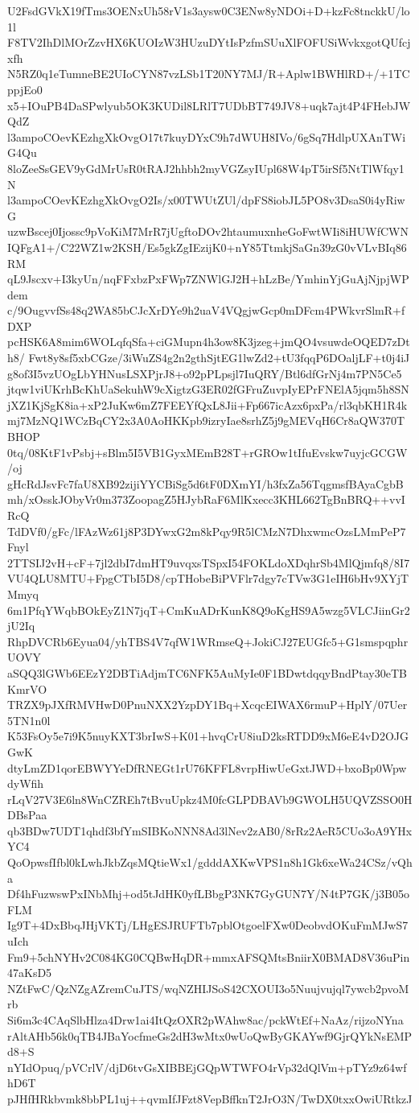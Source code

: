 U2FsdGVkX19fTms3OENxUh58rV1s3aysw0C3ENw8yNDOi+D+kzFc8tnckkU/lo1l
F8TV2IhDlMOrZzvHX6KUOIzW3HUzuDYtIsPzfmSUuXlFOFUSiWvkxgotQUfcjxfh
N5RZ0q1eTumneBE2UIoCYN87vzLSb1T20NY7MJ/R+Aplw1BWHlRD+/+1TCppjEo0
x5+IOuPB4DaSPwlyub5OK3KUDil8LRlT7UDbBT749JV8+uqk7ajt4P4FHebJWQdZ
l3ampoCOevKEzhgXkOvgO17t7kuyDYxC9h7dWUH8IVo/6gSq7HdlpUXAnTWiG4Qu
8loZeeSsGEV9yGdMrUsR0tRAJ2hhbh2myVGZsyIUpl68W4pT5irSf5NtTlWfqy1N
l3ampoCOevKEzhgXkOvgO2Is/x00TWUtZUl/dpFS8iobJL5PO8v3DsaS0i4yRiwG
uzwBscej0Ijossc9pVoKiM7MrR7jUgftoDOv2htaumuxnheGoFwtWIi8iHUWfCWN
IQFgA1+/C22WZ1w2KSH/Es5gkZgIEzijK0+nY85TtmkjSaGn39zG0vVLvBIq86RM
qL9Jscxv+I3kyUn/nqFFxbzPxFWp7ZNWlGJ2H+hLzBe/YmhinYjGuAjNjpjWPdem
c/9OugvvfSs48q2WA85bCJcXrDYe9h2uaV4VQgjwGcp0mDFcm4PWkvrSlmR+fDXP
pcHSK6A8mim6WOLqfqSfa+ciGMupn4h3ow8K3jzeg+jmQO4vsuwdeOQED7zDth8/
Fwt8y8sf5xbCGze/3iWuZS4g2n2gthSjtEG1lwZd2+tU3fqqP6DOaljLF+t0j4iJ
g8of3I5vzUOgLbYHNusLSXPjrJ8+o92pPLpsjl7IuQRY/Btl6dfGrNj4m7PN5Ce5
jtqw1viUKrhBcKhUaSekuhW9cXigtzG3ER02fGFruZuvpIyEPrFNElA5jqm5h8SN
jXZ1KjSgK8ia+xP2JuKw6mZ7FEEYfQxL8Jii+Fp667icAzx6pxPa/rl3qbKH1R4k
mj7MzNQ1WCzBqCY2x3A0AoHKKpb9izryIae8srhZ5j9gMEVqH6Cr8aQW370TBHOP
0tq/08KtF1vPsbj+sBlm5I5VB1GyxMEmB28T+rGROw1tIfuEvskw7uyjcGCGW/oj
gHcRdJsvFc7faU8XB92zijiYYCBiSg5d6tF0DXmYI/h3fxZa56TqgmsfBAyaCgbB
mh/xOsskJObyVr0m373ZoopagZ5HJybRaF6MlKxecc3KHL662TgBnBRQ++vvIRcQ
TdDVf0/gFc/lFAzWz61j8P3DYwxG2m8kPqy9R5lCMzN7DhxwmcOzsLMmPeP7Fnyl
2TTSIJ2vH+cF+7jl2dbI7dmHT9uvqxsTSpxI54FOKLdoXDqhrSb4MlQjmfq8/8I7
VU4QLU8MTU+FpgCTbI5D8/cpTHobeBiPVFlr7dgy7cTVw3G1eIH6bHv9XYjTMmyq
6m1PfqYWqbBOkEyZ1N7jqT+CmKuADrKunK8Q9oKgHS9A5wzg5VLCJiinGr2jU2Iq
RhpDVCRb6Eyua04/yhTBS4V7qfW1WRmseQ+JokiCJ27EUGfc5+G1smspqphrUOVY
aSQQ3lGWb6EEzY2DBTiAdjmTC6NFK5AuMyIe0F1BDwtdqqyBndPtay30eTBKmrVO
TRZX9pJXfRMVHwD0PnuNXX2YzpDY1Bq+XcqcEIWAX6rmuP+HplY/07Uer5TN1n0l
K53FsOy5e7i9K5nuyKXT3brIwS+K01+hvqCrU8iuD2ksRTDD9xM6eE4vD2OJGGwK
dtyLmZD1qorEBWYYeDfRNEGt1rU76KFFL8vrpHiwUeGxtJWD+bxoBp0WpwdyWfih
rLqV27V3E6ln8WnCZREh7tBvuUpkz4M0fcGLPDBAVb9GWOLH5UQVZSSO0HDBsPaa
qb3BDw7UDT1qhdf3bfYmSIBKoNNN8Ad3lNev2zAB0/8rRz2AeR5CUo3oA9YHxYC4
QoOpwsfIfbl0kLwhJkbZqsMQtieWx1/gdddAXKwVPS1n8h1Gk6xeWa24CSz/vQha
Df4hFuzwswPxINbMhj+od5tJdHK0yfLBbgP3NK7GyGUN7Y/N4tP7GK/j3B05oFLM
Ig9T+4DxBbqJHjVKTj/LHgESJRUFTb7pblOtgoelFXw0DeobvdOKuFmMJwS7uIch
Fm9+5chNYHv2C084KG0CQBwHqDR+mmxAFSQMtsBniirX0BMAD8V36uPin47aKsD5
NZtFwC/QzNZgAZremCuJTS/wqNZHIJSoS42CXOUI3o5Nuujvujql7ywcb2pvoMrb
Si6m3c4CAqSlbHlza4Drw1ai4ItQzOXR2pWAhw8ac/pckWtEf+NaAz/rijzoNYna
rAltAHb56k0qTB4JBaYocfmeGs2dH3wMtx0wUoQwByGKAYwf9GjrQYkNsEMPd8+S
nYIdOpuq/pVCrlV/djD6tvGsXIBBEjGQpWTWFO4rVp32dQlVm+pTYz9z64wfhD6T
pJHfHRkbvmk8bbPL1uj++qvmIfJFzt8VepBffknT2JrO3N/TwDX0txxOwiURtkzJ
